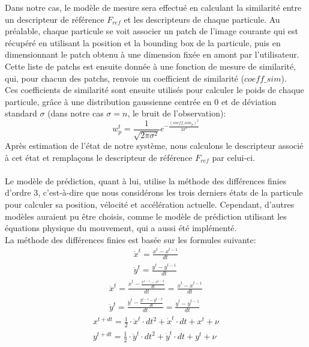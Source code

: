 Dans notre cas, le modèle de mesure sera effectué en calculant la similarité entre un descripteur de référence $F_{ref}$ et les descripteurs de chaque particule. Au préalable, chaque particule se voit associer un patch de l'image courante qui est récupéré en utilisant la position et la bounding box de la particule, puis en dimensionnant le patch obtenu à une dimension fixée en amont par l'utilisateur.\\
Cette liste de patchs est ensuite donnée à une fonction de mesure de similarité, qui, pour chacun des patchs, renvoie un coefficient de similarité ($coeff\_sim$).\\
Ces coefficients de similarité sont ensuite utilisés pour calculer le poids de chaque particule, grâce à une distribution gaussienne centrée en 0 et de déviation standard $\sigma$ (dans notre cas $\sigma=n$, le bruit de l'observation):
$$w_{p}^{t} = \frac{1}{\sqrt{2\pi\sigma^{2}}}e^{-\frac{(coeff\_sim_{p})^{2}}{2\sigma^{2}}}$$
Après estimation de l'état de notre système, nous calculons le descripteur associé à cet état et remplaçons le descripteur de référence $F_{ref}$ par celui-ci.\\
\\
Le modèle de prédiction, quant à lui, utilise la méthode des différences finies d'ordre 3, c'est-à-dire que nous considérons les trois derniers états de la particule pour calculer sa position, vélocité et accélération actuelle. Cependant, d'autres modèles auraient pu être choisis, comme le modèle de prédiction utilisant les équations physique du mouvement, qui a aussi été implémenté.\\
La méthode des différences finies est basée sur les formules suivante:
\begin{equation} \label{eq:vel}
\begin{split}
\dot{x}^{t} = \frac{x^{t} - x^{t-1}}{dt}\\
\dot{y}^{t} = \frac{y^{t} - y^{t-1}}{dt}
\end{split}
\end{equation}
\vspace{0.4cm}
\begin{equation} \label{eq:accel}
\begin{split}
\ddot{x}^{t} = \frac{\dot{x}^{t} - \frac{x^{t-1} - x^{t-2}}{dt}}{dt} = \frac{\dot{x}^{t} - \dot{x}^{t-1}}{dt}\\
\ddot{y}^{t} = \frac{\dot{y}^{t} - \frac{y^{t-1} - y^{t-2}}{dt}}{dt} = \frac{\dot{y}^{t} - \dot{y}^{t-1}}{dt}
\end{split}
\end{equation}
\vspace{0.4cm}
\begin{equation} \label{eq:pos}
\begin{split}
x^{t+dt} = \frac{1}{2} \cdot \ddot{x}^{t} \cdot dt^{2} + \dot{x}^{t} \cdot dt + x^{t} + \nu\\
y^{t+dt} = \frac{1}{2} \cdot \ddot{y}^{t} \cdot dt^{2} + \dot{y}^{t} \cdot dt + y^{t} + \nu
\end{split}
\end{equation}

